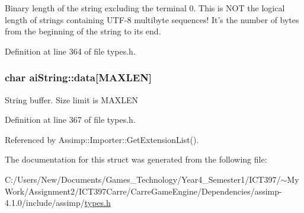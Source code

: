 Binary length of the string excluding the terminal 0. This is NOT the logical length of strings containing UTF-8 multibyte sequences! It's the number of bytes from the beginning of the string to its end. 

Definition at line 364 of file types.h.\hypertarget{structai_string_a90b1da7d347a3dcca0a95061e6ea41d}{
\subsubsection[data]{\setlength{\rightskip}{0pt plus 5cm}char {\bf aiString::data}\mbox{[}MAXLEN\mbox{]}}}
\label{structai_string_a90b1da7d347a3dcca0a95061e6ea41d}


String buffer. Size limit is MAXLEN 

Definition at line 367 of file types.h.

Referenced by Assimp::Importer::GetExtensionList().

The documentation for this struct was generated from the following file:\begin{CompactItemize}
\item 
C:/Users/New/Documents/Games\_\-Technology/Year4\_\-Semester1/ICT397/$\sim$My Work/Assignment2/ICT397Carre/CarreGameEngine/Dependencies/assimp-4.1.0/include/assimp/\hyperlink{types_8h}{types.h}\end{CompactItemize}

